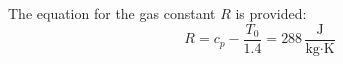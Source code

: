 The equation for the gas constant \( R \) is provided:  
\[
R = c_p - \frac{T_0}{1.4} = 288 \, \frac{\text{J}}{\text{kg·K}}
\]